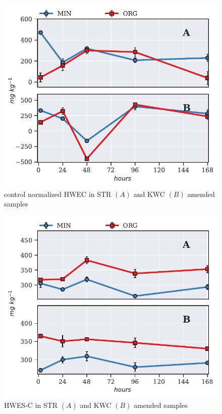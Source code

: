 \documentclass[12pt]{report}
\newcommand{\ScalePreTreated}{1.2}
\begin{document}
		\begin{figure}[H]
			\centering
			\includegraphics[scale=\ScalePreTreated]{thesis_figures/preliminary/control_normalized/HWEC.pdf}
			\caption{control normalized HWEC in STR $\left(A\right)$ and KWC $\left(B\right)$ amended   samples}
			\label{fig:nor_hwec_treated_preliminary}
		\end{figure}
		
		\begin{figure}[H]
			\centering
			\includegraphics[scale=1]{thesis_figures/preliminary/treated/HWES-C.pdf}
			\caption{HWES-C in STR $\left(A\right)$ and KWC $\left(B\right)$ amended   samples}
			\label{fig:hwes-c_treated_preliminary}
		\end{figure}
	
\end{document}
